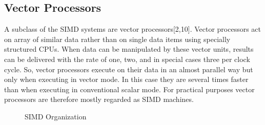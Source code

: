 \subsection{Vector Processors}
A subclass of the SIMD systems are vector processors[2,10]. Vector processors act on array of similar data rather than on single data items using specially
structured CPUs. When data can be manipulated by these vector units, results can be delivered with the rate of one, two, and in special cases three per clock
cycle. So, vector processors execute on their data in an almost parallel way but only when executing in vector mode. In this case they are several times
faster than when executing in conventional scalar mode. For practical purposes vector processors are therefore mostly regarded as SIMD machines.

\begin{figure}[ht]
{\centering {} \par}
\caption{SIMD Organization}
\end{figure}

